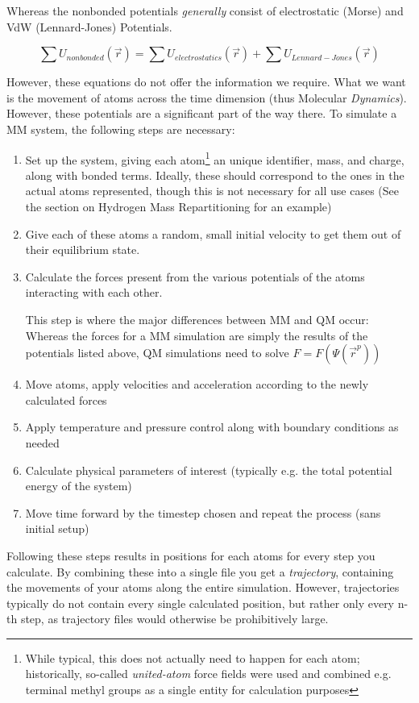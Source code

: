 \documentclass[oneside]{scrreprt}
\begin{document}
Whereas the nonbonded potentials \emph{generally} consist of electrostatic (Morse) and VdW (Lennard-Jones) Potentials.

\begin{equation}
    \sum U_{nonbonded} (\Vec{r})=\sum U_{electrostatics} (\Vec{r}) + \sum U_{Lennard-Jones} (\Vec{r})
\end{equation}


However, these equations do not offer the information we require. What we want is the movement of atoms across the time dimension (thus Molecular \emph{Dynamics}). However, these potentials are a significant part of the way there. To simulate a MM system, the following steps are necessary:

\begin{enumerate}
    \item Set up the system, giving each atom\footnote{While typical, this does not actually need to happen for each atom; historically, so-called \emph{united-atom} force fields were used and combined e.g. terminal methyl groups as a single entity for calculation purposes} an unique identifier, mass, and charge, along with bonded terms. Ideally, these should correspond to the ones in the actual atoms represented, though this is not necessary for all use cases (See the section on Hydrogen Mass Repartitioning for an example)
    \item Give each of these atoms a random, small initial velocity to get them out of their equilibrium state.
    \item Calculate the forces present from the various potentials of the atoms interacting with each other.
    
    This step is where the major differences between MM and QM occur: Whereas the forces for a MM simulation are simply the results of the potentials listed above, QM simulations need to solve $F=F(\Psi(\Vec{r}^p))$
    \item Move atoms, apply velocities and acceleration according to the newly calculated forces
    \item Apply temperature and pressure control along with boundary conditions as needed
    \item Calculate physical parameters of interest (typically e.g. the total potential energy of the system)
    \item Move time forward by the timestep chosen and repeat the process (sans initial setup)
\end{enumerate}

Following these steps results in positions for each atoms for every step you calculate. By combining these into a single file you get a \emph{trajectory}, containing the movements of your atoms along the entire simulation. However, trajectories typically do not contain every single calculated position, but rather only every n-th step, as trajectory files would otherwise be prohibitively large.
\end{document}
